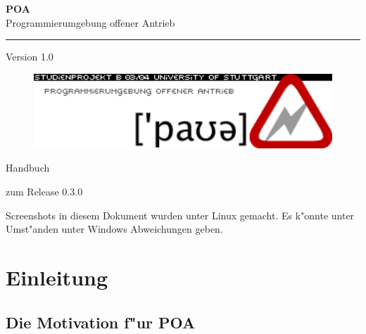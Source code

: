 \documentclass[a4paper,titlepage,12pt,ngerman]{scrbook}
\newcommand\version{Version 1.0 \xspace}
\begin{document}

\begin{titlepage}
\renewcommand{\thefootnote}{\fnsymbol{footnote}}
{\Huge
\raggedright
\textbf{POA} \\
\huge Programmierumgebung offener Antrieb
\rule{\textwidth}{0.75pt}
\par
}
\begin{flushleft}
\normalsize
\version
\vfill

\begin{figure}[htbp]
\begin{center}
\includegraphics[width=15cm]{poa-logo}
\end{center}
\end{figure}

\end{flushleft}
\vfill

{\parindent=0cm
\Huge Handbuch
\normalsize
\par zum Release 0.3.0
\par 
Screenshots in diesem Dokument wurden unter Linux gemacht.\newline
Es k"onnte unter Umst"anden unter Windows Abweichungen geben.
}


\setcounter{footnote}{0}
\end{titlepage}



\tableofcontents

\chapter{Einleitung}
\section{Die Motivation f"ur POA}
\end{document}
